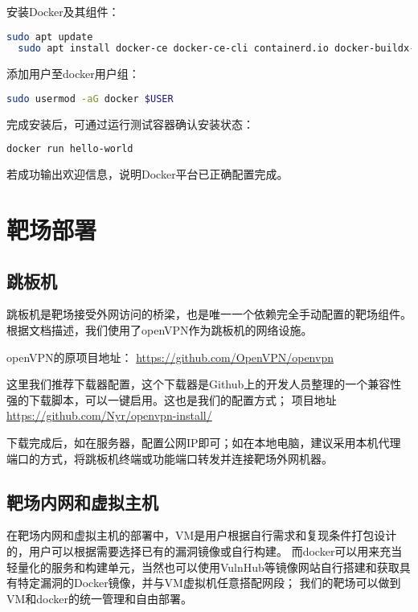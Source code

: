 \documentclass[lang=cn,10pt]{elegantbook}
\begin{document}
安装Docker及其组件：

\begin{lstlisting}[language=bash]
  sudo apt update
  sudo apt install docker-ce docker-ce-cli containerd.io docker-buildx-plugin docker-compose-plugin
\end{lstlisting}

添加用户至docker用户组：

\begin{lstlisting}[language=bash]
  sudo usermod -aG docker $USER
\end{lstlisting}

完成安装后，可通过运行测试容器确认安装状态：

\begin{lstlisting}[language=bash]
  docker run hello-world
\end{lstlisting}

若成功输出欢迎信息，说明Docker平台已正确配置完成。


\section{靶场部署}

\subsection{跳板机}

跳板机是靶场接受外网访问的桥梁，也是唯一一个依赖完全手动配置的靶场组件。根据文档描述，我们使用了openVPN作为跳板机的网络设施。

openVPN的原项目地址：
\href{https://github.com/OpenVPN/openvpn}{https://github.com/OpenVPN/openvpn}

这里我们推荐下载器配置，这个下载器是Github上的开发人员整理的一个兼容性强的下载脚本，可以一键启用。这也是我们的配置方式；
项目地址
\href{https://github.com/Nyr/openvpn-install/}{https://github.com/Nyr/openvpn-install/}

下载完成后，如在服务器，配置公网IP即可；如在本地电脑，建议采用本机代理端口的方式，将跳板机终端或功能端口转发并连接靶场外网机器。


\subsection{靶场内网和虚拟主机}

在靶场内网和虚拟主机的部署中，VM是用户根据自行需求和复现条件打包设计的，用户可以根据需要选择已有的漏洞镜像或自行构建。
而docker可以用来充当轻量化的服务和构建单元，当然也可以使用VulnHub等镜像网站自行搭建和获取具有特定漏洞的Docker镜像，并与VM虚拟机任意搭配网段；
我们的靶场可以做到VM和docker的统一管理和自由部署。
\end{document}
